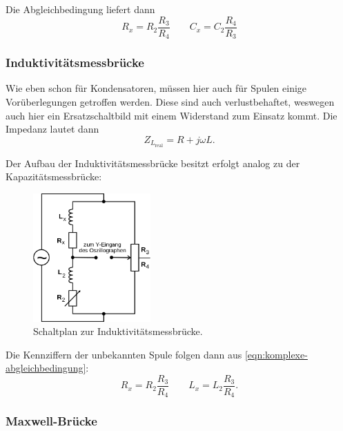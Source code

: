 Die Abgleichbedingung liefert dann
\begin{equation}
	R_x = R_2 \frac{R_3}{R_4}
	\qquad
	C_x = C_2 \frac{R_4}{R_3}
	\label{eqn:values-kapazitaeten}
\end{equation}

\subsubsection{Induktivitätsmessbrücke}
\label{sec:theorie-induktivitätsmessbrücke}

Wie eben schon für Kondensatoren, müssen hier auch für Spulen einige Vorüberlegungen getroffen werden.
Diese sind auch verlustbehaftet, weswegen auch hier ein Ersatzschaltbild mit einem Widerstand zum Einsatz kommt.
Die Impedanz lautet dann
\begin{equation}
	Z_{L_\text{real}} = R + j \omega L.
	\label{eqn:reale-induktivitaet}
\end{equation}

Der Aufbau der Induktivitätsmessbrücke besitzt erfolgt analog zu der Kapazitätsmessbrücke:
\begin{figure}[H]
	\centering
	\includegraphics[width=0.4\textwidth]{bilder/induktivitaetsbruecke.png}
	\caption{Schaltplan zur Induktivitätsmessbrücke.}
	\label{fig:induktivitaetsbruecke}
\end{figure}

Die Kennziffern der unbekannten Spule folgen dann aus \autoref{eqn:komplexe-abgleichbedingung}:
\begin{equation}
	R_x = R_2 \frac{R_3}{R_4}
	\qquad
	L_x = L_2 \frac{R_3}{R_4}.
	\label{eqn:values-induktivitaetsbruecke}
\end{equation}


\subsubsection{Maxwell-Brücke}
\label{sec:theorie-maxwell-bruecke}

